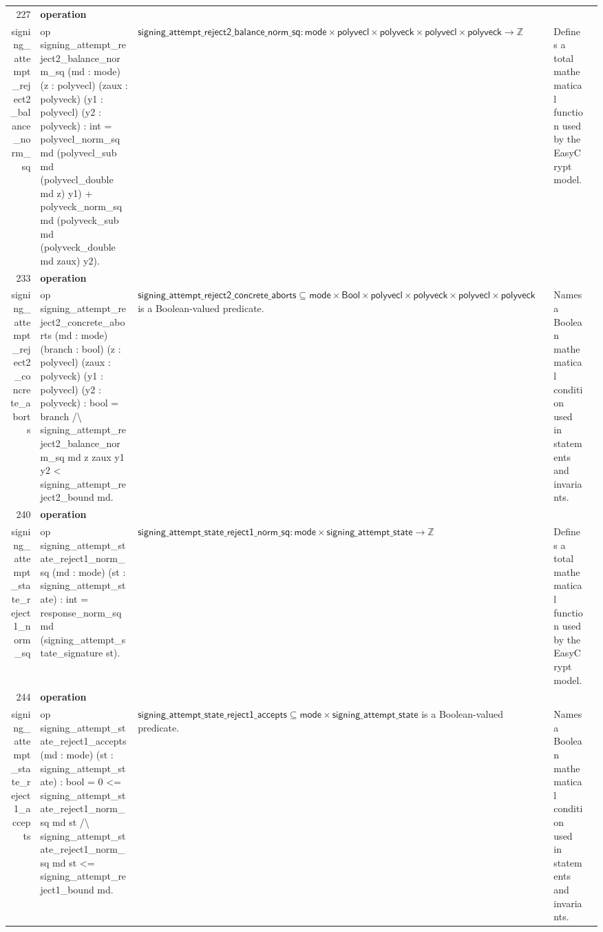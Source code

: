 \documentclass[10pt]{article}
\newcommand{\ec}[1]{\begingroup\ttfamily\scriptsize #1\endgroup}
\begin{document}
\begin{longtable}{r L{0.17\textwidth} L{0.26\textwidth} L{0.27\textwidth} L{0.20\textwidth}}
227 & \textbf{operation}\\\ec{signing\_attempt\_reject2\_balance\_norm\_sq} & \ec{op signing\_attempt\_reject2\_balance\_norm\_sq (md : mode) (z : polyvecl) (zaux : polyveck) (y1 : polyvecl) (y2 : polyveck) : int = polyvecl\_norm\_sq md (polyvecl\_sub md (polyvecl\_double md z) y1) + polyveck\_norm\_sq md (polyveck\_sub md (polyveck\_double md zaux) y2).} & \(\mathsf{signing\_attempt\_reject2\_balance\_norm\_sq} : \mathsf{mode} \times \mathsf{polyvecl} \times \mathsf{polyveck} \times \mathsf{polyvecl} \times \mathsf{polyveck} \to \mathbb{Z}\) & Defines a total mathematical function used by the EasyCrypt model. \\
233 & \textbf{operation}\\\ec{signing\_attempt\_reject2\_concrete\_aborts} & \ec{op signing\_attempt\_reject2\_concrete\_aborts (md : mode) (branch : bool) (z : polyvecl) (zaux : polyveck) (y1 : polyvecl) (y2 : polyveck) : bool = branch /\textbackslash{} signing\_attempt\_reject2\_balance\_norm\_sq md z zaux y1 y2 < signing\_attempt\_reject2\_bound md.} & \(\mathsf{signing\_attempt\_reject2\_concrete\_aborts} \subseteq \mathsf{mode} \times \mathsf{Bool} \times \mathsf{polyvecl} \times \mathsf{polyveck} \times \mathsf{polyvecl} \times \mathsf{polyveck}\) is a Boolean-valued predicate. & Names a Boolean mathematical condition used in statements and invariants. \\
240 & \textbf{operation}\\\ec{signing\_attempt\_state\_reject1\_norm\_sq} & \ec{op signing\_attempt\_state\_reject1\_norm\_sq (md : mode) (st : signing\_attempt\_state) : int = response\_norm\_sq md (signing\_attempt\_state\_signature st).} & \(\mathsf{signing\_attempt\_state\_reject1\_norm\_sq} : \mathsf{mode} \times \mathsf{signing\_attempt\_state} \to \mathbb{Z}\) & Defines a total mathematical function used by the EasyCrypt model. \\
244 & \textbf{operation}\\\ec{signing\_attempt\_state\_reject1\_accepts} & \ec{op signing\_attempt\_state\_reject1\_accepts (md : mode) (st : signing\_attempt\_state) : bool = 0 <= signing\_attempt\_state\_reject1\_norm\_sq md st /\textbackslash{} signing\_attempt\_state\_reject1\_norm\_sq md st <= signing\_attempt\_reject1\_bound md.} & \(\mathsf{signing\_attempt\_state\_reject1\_accepts} \subseteq \mathsf{mode} \times \mathsf{signing\_attempt\_state}\) is a Boolean-valued predicate. & Names a Boolean mathematical condition used in statements and invariants. \\

\end{longtable}
\end{document}
